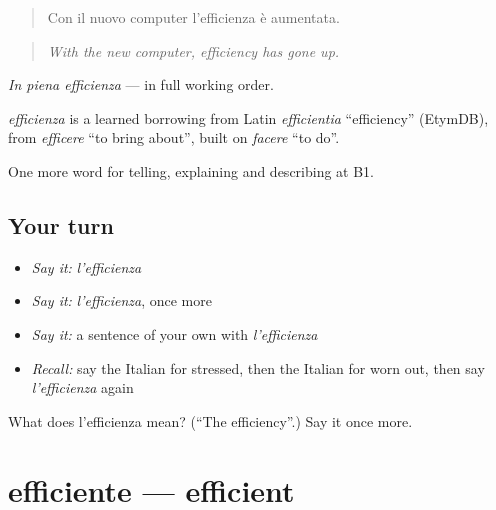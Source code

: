 \begin{quote}
Con il nuovo computer l'efficienza è aumentata.
\end{quote}

\begin{quote}
\emph{With the new computer, efficiency has gone up.}
\end{quote}

\emph{In piena efficienza} — in full working order.

\begin{cousinweb}
\emph{efficienza} is a learned borrowing from Latin \emph{efficientia} \textquotedblleft{}efficiency\textquotedblright{} (EtymDB), from \emph{efficere} \textquotedblleft{}to bring about\textquotedblright{}, built on \emph{facere} \textquotedblleft{}to do\textquotedblright{}.
\end{cousinweb}

\begin{grammarlens}[title={What you've built}]
One more word for telling, explaining and describing at B1.
\end{grammarlens}

\subsection*{Your turn}
\begin{itemize}
\raggedright
  \item \emph{Say it:} \emph{l'efficienza}
  \item \emph{Say it:} \emph{l'efficienza}, once more
  \item \emph{Say it:} a sentence of your own with \emph{l'efficienza}
  \item \emph{Recall:} say the Italian for stressed, then the Italian for worn out, then say \emph{l'efficienza} again
\end{itemize}

\begin{tcolorbox}[breakable,colback=teal!4,colframe=teal!35!black,title={Before you move on}]
What does l'efficienza mean? (\textquotedblleft{}The efficiency\textquotedblright{}.) Say it once more.
\end{tcolorbox}
\section[efficiente]{efficiente — efficient}

\label{lesson:IT-C362-efficiente}



